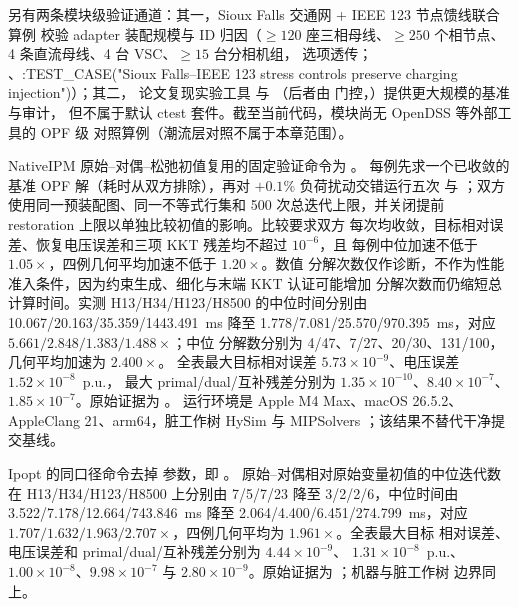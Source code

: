 另有两条模块级验证通道：其一，Sioux Falls 交通网 + IEEE 123 节点馈线联合算例
校验 adapter 装配规模与 ID 归因（$\ge 120$ 座三相母线、$\ge 250$ 个相节点、
4 条直流母线、4 台 VSC、$\ge 15$ 台分相机组， 选项透传；
、:TEST\_CASE("Sioux Falls--IEEE 123 stress controls preserve charging injection")）；其二，
论文复现实验工具  与
（后者由 
门控，）提供更大规模的基准与审计，
但不属于默认 ctest 套件。截至当前代码，模块尚无 OpenDSS 等外部工具的 OPF 级
对照算例（潮流层对照不属于本章范围）。

NativeIPM 原始--对偶--松弛初值复用的固定验证命令为
。
每例先求一个已收敛的基准 OPF 解（耗时从双方排除），再对 $+0.1\%$ 负荷扰动交错运行五次
 与 ；双方使用同一预装配图、同一不等式行集和
500 次总迭代上限，并关闭提前 restoration 上限以单独比较初值的影响。比较要求双方
每次均收敛，目标相对误差、恢复电压误差和三项 KKT 残差均不超过 $10^{-6}$，且
每例中位加速不低于 $1.05\times$，四例几何平均加速不低于 $1.20\times$。数值
分解次数仅作诊断，不作为性能准入条件，因为约束生成、细化与末端 KKT 认证可能增加
分解次数而仍缩短总计算时间。实测 H13/H34/H123/H8500 的中位时间分别由
10.067/20.163/35.359/1443.491~ms 降至
1.778/7.081/25.570/970.395~ms，对应 $5.661/2.848/1.383/1.488\times$；中位
分解数分别为 4/47、7/27、20/30、131/100，几何平均加速为 $2.400\times$。
全表最大目标相对误差 $5.73\times10^{-9}$、电压误差 $1.52\times10^{-8}$~p.u.，
最大 primal/dual/互补残差分别为 $1.35\times10^{-10}$、$8.40\times10^{-7}$、
$1.85\times10^{-7}$。原始证据为
。
运行环境是 Apple M4 Max、macOS 26.5.2、AppleClang 21、arm64，脏工作树 HySim
 与 MIPSolvers ；该结果不替代干净提交基线。

Ipopt 的同口径命令去掉  参数，即
。
原始--对偶相对原始变量初值的中位迭代数在 H13/H34/H123/H8500 上分别由
7/5/7/23 降至 3/2/2/6，中位时间由
3.522/7.178/12.664/743.846~ms 降至 2.064/4.400/6.451/274.799~ms，对应
$1.707/1.632/1.963/2.707\times$，四例几何平均为 $1.961\times$。全表最大目标
相对误差、电压误差和 primal/dual/互补残差分别为 $4.44\times10^{-9}$、
$1.31\times10^{-8}$~p.u.、$1.00\times10^{-8}$、$9.98\times10^{-7}$ 与
$2.80\times10^{-9}$。原始证据为
；机器与脏工作树
边界同上。

